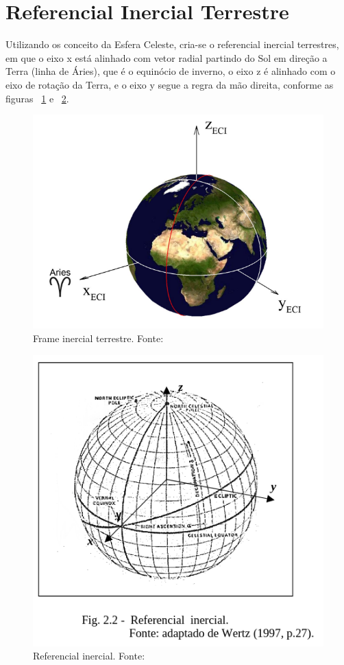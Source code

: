 \section{Referencial Inercial Terrestre}

Utilizando os conceito da  Esfera Celeste, cria-se o referencial inercial terrestres, 
em que o eixo x está alinhado com vetor radial partindo do Sol em direção a Terra (linha de Áries), 
que é o equinócio de inverno, o eixo z é alinhado com o eixo de rotação da Terra, 
e o eixo y segue a regra da mão direita, conforme as figuras ~\ref{fig:Frame_inercial_terrestre} e ~\ref{fig:Referencial_inercial}.

\begin{figure}[H]
	\centering
	\includegraphics[width=.7\columnwidth]{images/Frame_inercial_terrestre.png}
	\caption{Frame inercial terrestre. Fonte: ~\cite[]{Diaz}}
	\label{fig:Frame_inercial_terrestre}
\end{figure}

\begin{figure}[H]
	\centering
	\includegraphics[width=.7\columnwidth, trim=0 60 0 0, clip=true, ]{images/Referencial_inercial.png}
	\caption{Referencial inercial. Fonte: ~\cite[]{Carvalho}}
	\label{fig:Referencial_inercial}
\end{figure}


